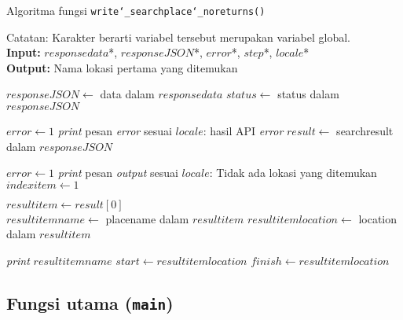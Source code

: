 \begin{algorithm}[h]
	\caption{Algoritma fungsi \texttt{write\char`_searchplace\char`_noreturns()}}
	\label{alg:design-write-searchplacenoreturns}
	\vspace{-0.6\baselineskip}
	\begin{flushleft}
		Catatan: Karakter \textquotesingle *\textquotesingle\xspace berarti variabel tersebut merupakan variabel global. \\
		\textbf{Input:} $responsedata$*, $responseJSON$*, $error$*, $step$*, $locale$* \\
		\textbf{Output:} Nama lokasi pertama yang ditemukan \\
	\end{flushleft}
	\vspace{-1.05\baselineskip}
	\begin{algorithmic}
		\State $responseJSON \gets$ data dalam $responsedata$
		\State $status \gets$ \textquotesingle\textquotesingle status\textquotesingle\textquotesingle\xspace dalam $responseJSON$
		
			\State $error \gets 1$
			\State \textit{print} pesan \textit{error} sesuai $locale$: hasil API \textit{error}
		\Else
			\State $result \gets$ \textquotesingle\textquotesingle searchresult\textquotesingle\textquotesingle\xspace dalam $responseJSON$
			
				\State $error \gets 1$
				\State \textit{print} pesan \textit{output} sesuai $locale$: Tidak ada lokasi yang ditemukan
			\Else
				\State $indexitem \gets 1$
				
				\State $resultitem \gets result[0]$ \\
				\State $resultitemname \gets$ \textquotesingle\textquotesingle placename\textquotesingle\textquotesingle\xspace dalam $resultitem$
				\State $resultitemlocation \gets$ \textquotesingle\textquotesingle location\textquotesingle\textquotesingle\xspace dalam $resultitem$
				
				\State \textit{print} $resultitemname$
					\State $start \gets resultitemlocation$
					\State $finish \gets resultitemlocation$
				\EndIf
			\EndIf
		\EndIf
	\end{algorithmic}
\end{algorithm}

\subsection{Fungsi utama (\texttt{main})}
\label{sec:design-code-main}

